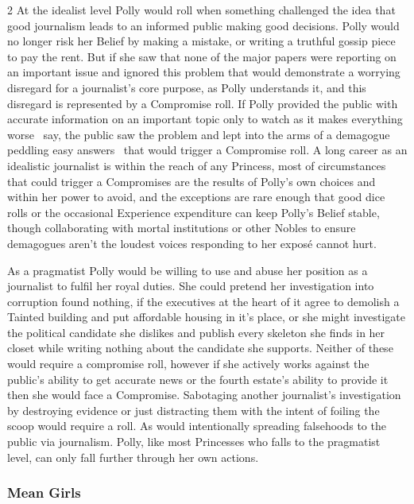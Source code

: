 \begin{multicols}{2}
At the idealist level Polly would roll when something challenged the idea that good journalism leads to an informed public making good decisions. Polly would no longer risk her Belief by making a mistake, or writing a truthful gossip piece to pay the rent. But if she saw that none of the major papers were reporting on an important issue and ignored this problem that would demonstrate a worrying disregard for a journalist's core purpose, as Polly understands it, and this disregard is represented by a Compromise roll. If Polly provided the public with accurate information on an important topic only to watch as it makes everything worse \textemdash\, say, the public saw the problem and lept into the arms of a demagogue peddling easy answers \textemdash\, that would trigger a Compromise roll. A long career as an idealistic journalist is within the reach of any Princess, most of circumstances that could trigger a Compromises are the results of Polly's own choices and within her power to avoid, and the exceptions are rare enough that good dice rolls or the occasional Experience expenditure can keep Polly's Belief stable, though collaborating with mortal institutions or other Nobles to ensure demagogues aren't the loudest voices responding to her expos\'e cannot hurt.  

As a pragmatist Polly would be willing to use and abuse her position as a journalist to fulfil her royal duties. She could pretend her investigation into corruption found nothing, if the executives at the heart of it agree to demolish a Tainted building and put affordable housing in it's place, or she might investigate the political candidate she dislikes and publish every skeleton she finds in her closet while writing nothing about the candidate she supports. Neither of these would require a compromise roll, however if she actively works against the public's ability to get accurate news or the fourth estate's ability to provide it then she would face a Compromise. Sabotaging another journalist's investigation by destroying evidence or just distracting them with the intent of foiling the scoop would require a roll. As would intentionally spreading falsehoods to the public via journalism. Polly, like most Princesses who falls to the pragmatist level, can only fall further through her own actions.  

\begin{mybox}


\subsubsection*{Mean Girls}


\end{mybox}
\end{multicols}
